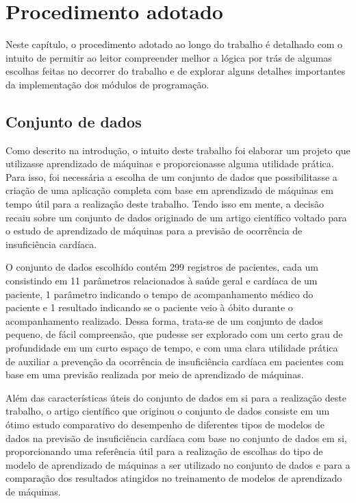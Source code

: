 \chapter{Procedimento adotado} \label{procedimento_adotado}

Neste capítulo, o procedimento adotado ao longo do trabalho é detalhado com o intuito de permitir ao leitor compreender melhor a lógica por trás de algumas escolhas feitas no decorrer do trabalho e de explorar alguns detalhes importantes da implementação dos módulos de programação.

\section{Conjunto de dados}

Como descrito na introdução, o intuito deste trabalho foi elaborar um projeto que utilizasse aprendizado de máquinas e proporcionasse alguma utilidade prática. Para isso, foi necessária a escolha de um conjunto de dados que possibilitasse a criação de uma aplicação completa com base em aprendizado de máquinas em tempo útil para a realização deste trabalho. Tendo isso em mente, a decisão recaiu sobre um conjunto de dados\cite{larxel_dataset} originado de um artigo científico\cite{chicco2020} voltado para o estudo de aprendizado de máquinas para a previsão de ocorrência de insuficiência cardíaca.

O conjunto de dados escolhido\cite{larxel_dataset} contém 299 registros de pacientes, cada um consistindo em 11 parâmetros relacionados à saúde geral e cardíaca de um paciente, 1 parâmetro indicando o tempo de acompanhamento médico do paciente e 1 resultado indicando se o paciente veio à óbito durante o acompanhamento realizado. Dessa forma, trata-se de um conjunto de dados pequeno, de fácil compreensão, que pudesse ser explorado com um certo grau de profundidade em um curto espaço de tempo, e com uma clara utilidade prática de auxiliar a prevenção da ocorrência de insuficiência cardíaca em pacientes com base em uma previsão realizada por meio de aprendizado de máquinas.

Além das características úteis do conjunto de dados em si para a realização deste trabalho, o artigo científico que originou o conjunto de dados\cite{chicco2020} consiste em um ótimo estudo comparativo do desempenho de diferentes tipos de modelos de dados na previsão de insuficiência cardíaca com base no conjunto de dados em si, proporcionando uma referência útil para a realização de escolhas do tipo de modelo de aprendizado de máquinas a ser utilizado no conjunto de dados e para a comparação dos resultados atingidos no treinamento de modelos de aprendizado de máquinas.

